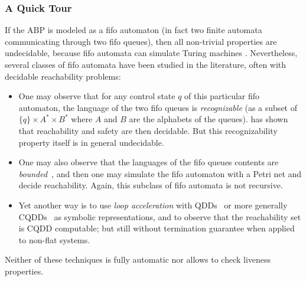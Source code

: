 \documentclass[11pt,reqno,a4paper]{amsart}
\theoremstyle{plain}
\theoremstyle{definition}
\theoremstyle{remark}
\renewcommand{\paragraph}{\subsubsection*}
\begin{document}
\paragraph{A Quick Tour}
If the ABP is modeled as a fifo automaton (in fact two finite automata
communicating through two fifo queues), then all non-trivial properties
are undecidable, because fifo automata can simulate Turing
machines \citep[see e.g.][]{BZ83}.  Nevertheless, several classes of
fifo automata have been studied in the literature, often with decidable
reachability problems:
\begin{itemize}
\item One may observe that for any control state $q$ of this particular
fifo automaton, the language of the two fifo queues is
\emph{recognizable} (as a subset of $\{q\}\times A^\ast\times B^\ast$
where $A$ and $B$ are the alphabets of the queues).   has
shown that reachability and safety are then decidable.  But this
recognizability property itself is in general undecidable.
\item One may also observe that the languages of the fifo queues contents
are \emph{bounded}~\citep{FC-Petri87}, and then one may simulate the
fifo automaton with a Petri net and decide reachability.  Again, this
subclass of fifo automata is not recursive.
\item Yet another way is to use \emph{loop acceleration} with
  QDDs~\citep{qdd} or more generally CQDDs~\citep{cqdd} as symbolic
  representations, and to observe that the reachability set is CQDD
  computable; but still without termination guarantee when applied to
  non-flat systems.
\end{itemize}
Neither of these techniques is fully automatic nor allows to check
liveness properties.
\end{document}
